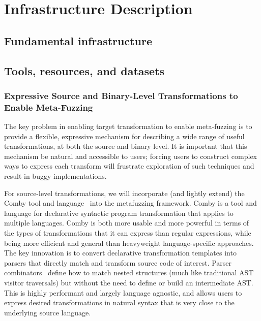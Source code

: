 \section{Infrastructure Description}

\subsection{Fundamental infrastructure}



\subsection{Tools, resources, and datasets}


\subsubsection{Expressive Source and Binary-Level Transformations to 
Enable Meta-Fuzzing}

The key problem in enabling target transformation to enable meta-fuzzing is to
provide a flexible, expressive mechanism for describing a wide range of useful
transformations, at both the source and binary level.  It is important that this
mechanism be natural and accessible to users; forcing users to 
construct complex ways to express each transform will frustrate exploration of such 
techniques and result in buggy implementations. 

For source-level transformations, we will incorporate (and lightly extend) the
Comby tool and language~\cite{rvt-ppc,comby-github} into the metafuzzing
framework.  Comby is a tool and language for declarative syntactic program
transformation that applies to multiple languages. Comby is both more usable and
more powerful in terms of the types of transformations that it can express than
regular expressions, while being more efficient and general than heavyweight
language-specific approaches. The key innovation is to convert declarative
transformation templates into parsers that directly match and transform source
code of interest. Parser combinators~\cite{Hutton96monadicparser} define how to
match nested structures (much like traditional AST visitor traversals) but
without the need to define or build an intermediate AST. This is highly
performant and largely language agnostic, and allows users to express desired
transformations in natural syntax that is very close to the underlying source
language. 

